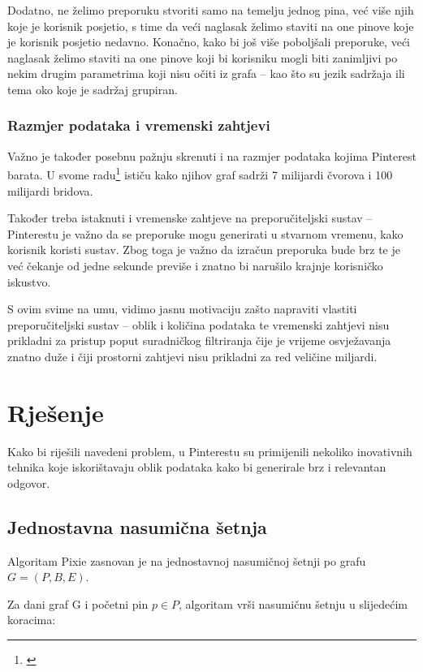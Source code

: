 \documentclass[times, utf8, seminar]{fer}
\begin{document}
Dodatno, ne želimo preporuku stvoriti samo na temelju jednog pina, već više njih koje je korisnik posjetio, s time da veći naglasak želimo staviti na one pinove koje je korisnik posjetio nedavno. Konačno, kako bi još više poboljšali preporuke, veći naglasak želimo staviti na one pinove koji bi korisniku mogli biti zanimljivi po nekim drugim parametrima koji nisu očiti iz grafa -- kao što su jezik sadržaja ili tema oko koje je sadržaj grupiran.

\subsection{Razmjer podataka i vremenski zahtjevi}

Važno je također posebnu pažnju skrenuti i na razmjer podataka kojima Pinterest barata. U svome radu\footnote{\cite{DBLP:journals/corr/abs-1711-07601}} ističu kako njihov graf sadrži 7 milijardi čvorova i 100 milijardi bridova.

Također treba istaknuti i vremenske zahtjeve na preporučiteljski sustav -- Pinterestu je važno da se preporuke mogu generirati u stvarnom vremenu, kako korisnik koristi sustav. Zbog toga je važno da izračun preporuka bude brz te je već čekanje od jedne sekunde previše i znatno bi narušilo krajnje korisničko iskustvo.

S ovim svime na umu, vidimo jasnu motivaciju zašto napraviti vlastiti preporučiteljski sustav -- oblik i količina podataka te vremenski zahtjevi nisu prikladni za pristup poput suradničkog filtriranja čije je vrijeme osvježavanja znatno duže i čiji prostorni zahtjevi nisu prikladni za red veličine miljardi.

\chapter{Rješenje}

Kako bi riješili navedeni problem, u Pinterestu su primijenili nekoliko inovativnih tehnika koje iskorištavaju oblik podataka kako bi generirale brz i relevantan odgovor.

\section{Jednostavna nasumična šetnja}

Algoritam Pixie zasnovan je na jednostavnoj nasumičnoj šetnji po grafu $G = (P, B, E) $.

Za dani graf G i početni pin $p \in P$, algoritam vrši nasumičnu šetnju u slijedećim koracima:
\end{document}
